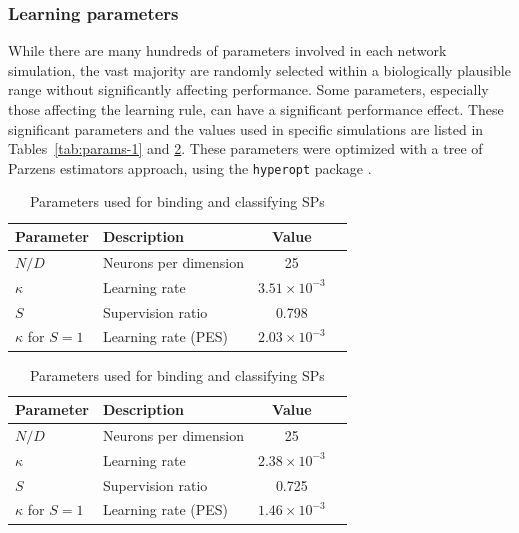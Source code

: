 \documentclass[10pt,letterpaper]{article}
\begin{document}
\subsubsection{Learning parameters}

While there are many hundreds of parameters
involved in each network simulation,
the vast majority are randomly selected
within a biologically plausible range
without significantly affecting performance.
Some parameters, especially those affecting
the learning rule, can have a significant performance effect.
These significant parameters and the values
used in specific simulations are listed
in Tables~\ref{tab:params-1} and \ref{tab:params-2}.
These parameters were optimized
with a tree of Parzens estimators approach,
using the \texttt{hyperopt} package \cite{Bergstra2013}.

\begin{table}[!ht]
\begin{center} 
\caption{Parameters used for transmitting semantic pointers}
\vspace{0.2ex}
\label{tab:params-1} 
\begin{tabular}{llcc} 
\hline
Parameter & Description & Value \\
\hline
$N / D$ & Neurons per dimension & 25 \\
$\kappa$ & Learning rate & $3.51 \times 10^{-3}$ \\
$S$ & Supervision ratio & 0.798 \\
$\kappa$ for $S = 1$ & Learning rate (PES) & $2.03 \times 10^{-3}$\\ 
\hline
\end{tabular} 
\end{center}
\begin{center} 
\caption{Parameters used for binding and classifying SPs}
\vspace{0.2ex}
\label{tab:params-2} 
\begin{tabular}{llcc} 
\hline
Parameter & Description & Value \\
\hline
$N / D$ & Neurons per dimension & 25 \\
$\kappa$ & Learning rate & $2.38 \times 10^{-3}$ \\
$S$ & Supervision ratio & 0.725 \\
$\kappa$ for $S = 1$ & Learning rate (PES) & $1.46 \times 10^{-3}$ \\ 
\hline
\end{tabular} 
\end{center}
\end{table}
\end{document}
